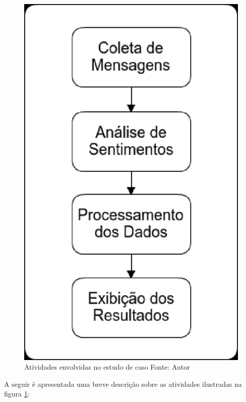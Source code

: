 \begin{figure}[ht!]
	\centering
	\includegraphics[keepaspectratio=true,scale=0.5]
	  {figuras/atividades.eps}
	\caption[Atividades envolvidas no estudo de caso]{Atividades envolvidas no estudo de caso
	\protect\linebreak Fonte: Autor}
	\label{fig-atividades}
\end{figure}
\FloatBarrier

A seguir é apresentada uma breve descrição sobre as atividades ilustradas na figura \ref{fig-atividades}:

